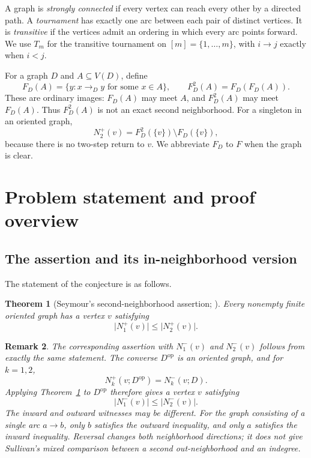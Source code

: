 \documentclass[11pt]{article}
\newcommand{\abs}[1]{\lvert#1\rvert}
\newtheorem{theorem}{Theorem}[section]
\newtheorem{remark}[theorem]{Remark}
\begin{document}
A graph is \emph{strongly connected} if every vertex can reach every
other by a directed path. A \emph{tournament} has exactly one arc
between each pair of distinct vertices. It is \emph{transitive} if
the vertices admit an ordering in which every arc points forward.
We use $T_m$ for the transitive tournament on $[m]=\{1,\ldots,m\}$,
with $i\to j$ exactly when $i<j$.

For a graph $D$ and $A\subseteq V(D)$, define
\begin{equation}
 F_D(A)=\{y:x\to_D y\text{ for some }x\in A\},\qquad
 F_D^2(A)=F_D(F_D(A)).
 \label{eq:ordinary-image}
\end{equation}
These are ordinary images: $F_D(A)$ may meet $A$, and $F_D^2(A)$
may meet $F_D(A)$. Thus $F_D^2(A)$ is not an exact second
neighborhood. For a singleton in an oriented graph,
\[
 N_2^+(v)=F_D^2(\{v\})\setminus F_D(\{v\}),
\]
because there is no two-step return to $v$. We abbreviate $F_D$ to
$F$ when the graph is clear. 

\section{Problem statement and proof overview}
\label{sec:problem}

\subsection{The assertion and its in-neighborhood version}
The statement of the conjecture is as follows.

\begin{theorem}[Seymour's second-neighborhood assertion; {\cite[Theorem 1.1]{openai}}]
\label{thm:main}
Every nonempty finite oriented graph has a vertex $v$ satisfying
\[
                      \abs{N_1^+(v)}\le\abs{N_2^+(v)}.
\]
\end{theorem}

\begin{remark}
The corresponding assertion with $N_1^-(v)$ and $N_2^-(v)$ follows
from exactly the same statement. The converse $D^{\mathrm{op}}$ is an oriented graph, and for $k=1,2$,
\[
 N_k^+(v;D^{\mathrm{op}})=N_k^-(v;D).
\]
Applying Theorem~\ref{thm:main} to $D^{\mathrm{op}}$ therefore gives
a vertex $v$ satisfying
\[
                      \abs{N_1^-(v)}\le\abs{N_2^-(v)}.
\]
The inward and outward witnesses may be different. For the graph
consisting of a single arc $a\to b$, only $b$ satisfies the outward
inequality, and only $a$ satisfies the inward inequality. Reversal
changes both neighborhood directions; it does not give Sullivan's
mixed comparison between a second out-neighborhood and an indegree.
\end{remark}
\end{document}

